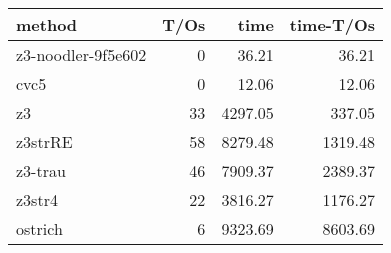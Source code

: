 \begin{tabular}{lrrr}
\hline
 method             &   T/Os &    time &   time-T/Os \\
\hline
 z3-noodler-9f5e602 &      0 &   36.21 &       36.21 \\
 cvc5               &      0 &   12.06 &       12.06 \\
 z3                 &     33 & 4297.05 &      337.05 \\
 z3strRE            &     58 & 8279.48 &     1319.48 \\
 z3-trau            &     46 & 7909.37 &     2389.37 \\
 z3str4             &     22 & 3816.27 &     1176.27 \\
 ostrich            &      6 & 9323.69 &     8603.69 \\
\hline
\end{tabular}
